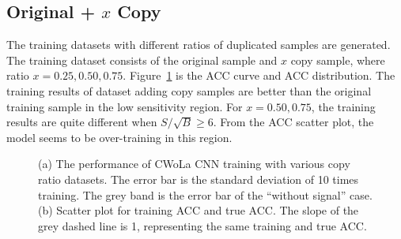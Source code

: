 \documentclass[12pt]{article}
\begin{document}
	\subsection{Original + $x$ Copy}%
	\label{sub:original_x_copy}
		The training datasets with different ratios of duplicated samples are generated. The training dataset consists of the original sample and $x$ copy sample, where ratio $x=0.25, 0.50, 0.75$. Figure~\ref{fig:cwola_cnn_training_performance_copy_ratio} is the ACC curve and ACC distribution. The training results of dataset adding copy samples are better than the original training sample in the low sensitivity region. For $x = 0.50, 0.75$, the training results are quite different when $S / \sqrt{B} \ge 6$. From the ACC scatter plot, the model seems to be over-training in this region.
		\begin{figure}[htpb]
			\centering
			\caption{(a) The performance of CWoLa CNN training with various copy ratio datasets. The error bar is the standard deviation of 10 times training. The grey band is the error bar of the ``without signal'' case. (b) Scatter plot for training ACC and true ACC. The slope of the grey dashed line is 1, representing the same training and true ACC.}
			\label{fig:cwola_cnn_training_performance_copy_ratio}
		\end{figure}
\end{document}
